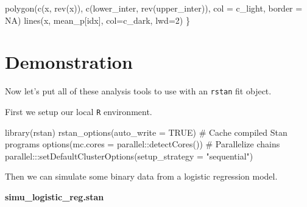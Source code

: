 \documentclass[
  letterpaper,
  DIV=11,
  numbers=noendperiod]{scrartcl}
\newenvironment{Shaded}{\begin{snugshade}}{\end{snugshade}}
\newcommand{\AttributeTok}[1]{\textcolor[rgb]{0.40,0.45,0.13}{#1}}
\newcommand{\CommentTok}[1]{\textcolor[rgb]{0.37,0.37,0.37}{#1}}
\newcommand{\ConstantTok}[1]{\textcolor[rgb]{0.56,0.35,0.01}{#1}}
\newcommand{\DecValTok}[1]{\textcolor[rgb]{0.68,0.00,0.00}{#1}}
\newcommand{\FunctionTok}[1]{\textcolor[rgb]{0.28,0.35,0.67}{#1}}
\newcommand{\NormalTok}[1]{\textcolor[rgb]{0.00,0.23,0.31}{#1}}
\newcommand{\SpecialCharTok}[1]{\textcolor[rgb]{0.37,0.37,0.37}{#1}}
\newcommand{\StringTok}[1]{\textcolor[rgb]{0.13,0.47,0.30}{#1}}
\begin{document}
\begin{Shaded}
\begin{Highlighting}[]
  \FunctionTok{polygon}\NormalTok{(}\FunctionTok{c}\NormalTok{(x, }\FunctionTok{rev}\NormalTok{(x)), }\FunctionTok{c}\NormalTok{(lower\_inter, }\FunctionTok{rev}\NormalTok{(upper\_inter)),}
          \AttributeTok{col =}\NormalTok{ c\_light, }\AttributeTok{border =} \ConstantTok{NA}\NormalTok{)}
  \FunctionTok{lines}\NormalTok{(x, mean\_p[idx], }\AttributeTok{col=}\NormalTok{c\_dark, }\AttributeTok{lwd=}\DecValTok{2}\NormalTok{)}
\NormalTok{\}}
\end{Highlighting}
\end{Shaded}

\hypertarget{demonstration}{%
\section{Demonstration}\label{demonstration}}

Now let's put all of these analysis tools to use with an \texttt{rstan}
fit object.

First we setup our local \texttt{R} environment.

\begin{Shaded}
\begin{Highlighting}[]
\FunctionTok{library}\NormalTok{(rstan)}
\FunctionTok{rstan\_options}\NormalTok{(}\AttributeTok{auto\_write =} \ConstantTok{TRUE}\NormalTok{)            }\CommentTok{\# Cache compiled Stan programs}
\FunctionTok{options}\NormalTok{(}\AttributeTok{mc.cores =}\NormalTok{ parallel}\SpecialCharTok{::}\FunctionTok{detectCores}\NormalTok{()) }\CommentTok{\# Parallelize chains}
\NormalTok{parallel}\SpecialCharTok{:::}\FunctionTok{setDefaultClusterOptions}\NormalTok{(}\AttributeTok{setup\_strategy =} \StringTok{"sequential"}\NormalTok{)}
\end{Highlighting}
\end{Shaded}

Then we can simulate some binary data from a logistic regression model.

\textbf{simu\_logistic\_reg.stan}
\end{document}
